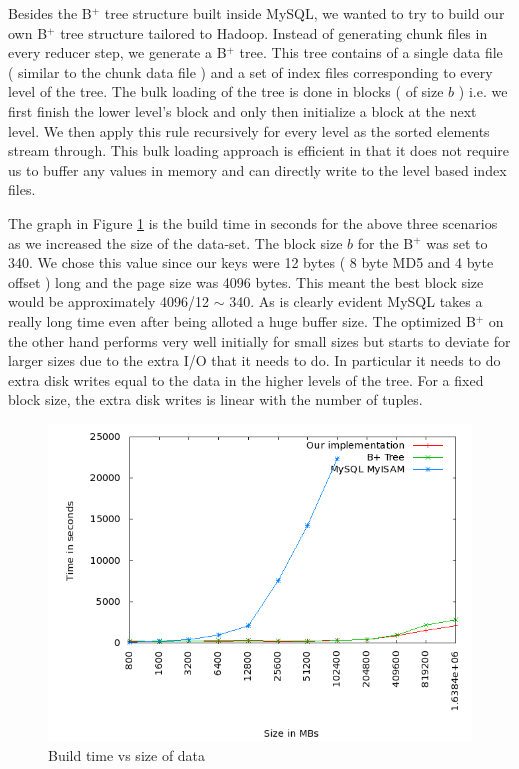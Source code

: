 \documentclass[10pt,twocolumn,preprint,natbib,authoryear]{sigplanconf}
\begin{document}
Besides the B$^{+}$ tree structure built inside MySQL, we wanted to try to build our own B$^{+}$ tree structure tailored to Hadoop. Instead of generating chunk files in every reducer step, we generate a B$^{+}$ tree. This tree contains of a single data file ( similar to the chunk data file ) and a set of index files corresponding to every level of the tree. The bulk loading of the tree is done in blocks ( of size $b$ ) i.e. we first finish the lower level's block and only then initialize a block at the next level. We then apply this rule recursively for every level as the sorted elements stream through. This bulk loading approach is efficient in that it does not require us to buffer any values in memory and can directly write to the level based index files. 

The graph in Figure \ref{build} is the build time in seconds for the above three scenarios as we increased the size of the data-set. The block size $b$ for the B$^{+}$ was set to 340. We chose this value since our keys were 12 bytes ( 8 byte MD5 and 4 byte offset ) long and the page size was 4096 bytes. This meant the best block size would be approximately 4096/12 $\sim$ 340. As is clearly evident MySQL takes a really long time even after being alloted a huge buffer size. The optimized B$^{+}$ on the other hand performs very well initially for small sizes but starts to deviate for larger sizes due to the extra I/O that it needs to do. In particular it needs to do extra disk writes equal to the data in the higher levels of the tree. For a fixed block size, the extra disk writes is linear with the number of tuples. 

\begin{figure}
  \centering
    \includegraphics[scale=0.35]{build.png}
  \caption{Build time vs size of data}
  \label{build}
\end{figure}
\end{document}

